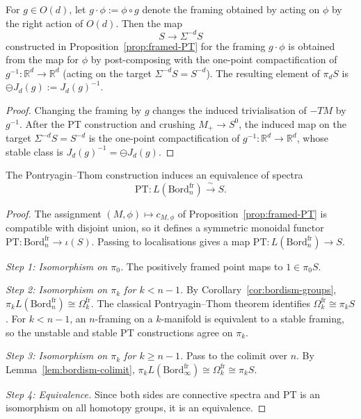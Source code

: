 \documentclass{amsart}
\begin{document}
\begin{lemma}
\label{lem:PT-equivariance}
For $g \in O(d)$, let $g \cdot \phi := \phi \circ g$ denote the framing obtained by acting on $\phi$ by the right action of $O(d)$. Then the map
\[
S \to \Sigma^{-d} S
\]
constructed in Proposition~\ref{prop:framed-PT} for the framing $g \cdot \phi$ is obtained from the map for $\phi$ by post-composing with the one-point compactification of $g^{-1} \colon \mathbb{R}^d \to \mathbb{R}^d$ (acting on the target $\Sigma^{-d} S = S^{-d}$). The resulting element of $\pi_d S$ is $\ominus J_d(g) := J_d(g)^{-1}$.
\end{lemma}

\begin{proof}
Changing the framing by $g$ changes the induced trivialisation of $-TM$ by $g^{-1}$. After the PT construction and crushing $M_+ \to S^0$, the induced map on the target $\Sigma^{-d} S = S^{-d}$ is the one-point compactification of $g^{-1} \colon \mathbb{R}^d \to \mathbb{R}^d$, whose stable class is $J_d(g)^{-1} = \ominus J_d(g)$.
\end{proof}

\begin{theorem}
\label{thm:PT-equivalence}
The Pontryagin--Thom construction induces an equivalence of spectra
\[
\mathrm{PT} \colon L(\mathrm{Bord}_n^{\mathrm{fr}}) \xrightarrow{\ \sim\ } S.
\]
\end{theorem}

\begin{proof}
The assignment $(M, \phi) \mapsto c_{M, \phi}$ of Proposition~\ref{prop:framed-PT} is compatible with disjoint union, so it defines a symmetric monoidal functor $\mathrm{PT} \colon \mathrm{Bord}_n^{\mathrm{fr}} \to \iota(S)$. Passing to localisations gives a map $\mathrm{PT} \colon L(\mathrm{Bord}_n^{\mathrm{fr}}) \to S$.

\emph{Step 1: Isomorphism on $\pi_0$.} The positively framed point maps to $1 \in \pi_0 S$.

\emph{Step 2: Isomorphism on $\pi_k$ for $k < n-1$.} By Corollary~\ref{cor:bordism-groups}, $\pi_k L(\mathrm{Bord}_n^{\mathrm{fr}}) \cong \Omega_k^{\mathrm{fr}}$. The classical Pontryagin--Thom theorem identifies $\Omega_k^{\mathrm{fr}} \cong \pi_k S$. For $k < n-1$, an $n$-framing on a $k$-manifold is equivalent to a stable framing, so the unstable and stable PT constructions agree on $\pi_k$.

\emph{Step 3: Isomorphism on $\pi_k$ for $k \geq n-1$.} Pass to the colimit over $n$. By Lemma~\ref{lem:bordism-colimit}, $\pi_k L(\mathrm{Bord}_\infty^{\mathrm{fr}}) \cong \Omega_k^{\mathrm{fr}} \cong \pi_k S$.

\emph{Step 4: Equivalence.} Since both sides are connective spectra and PT is an isomorphism on all homotopy groups, it is an equivalence.
\end{proof}
\end{document}

